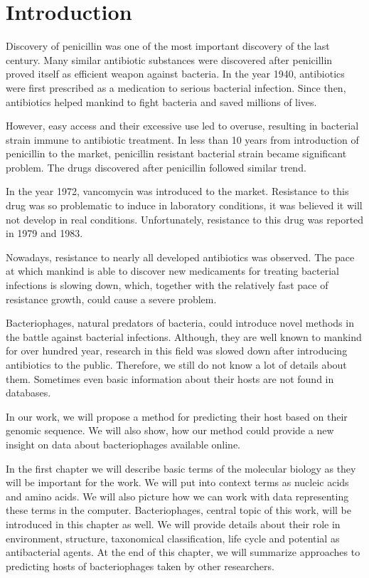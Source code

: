 \chapter*{Introduction} %

Discovery of penicillin was one of the most important discovery of the last century.
Many similar antibiotic substances were discovered after penicillin proved itself as efficient weapon against bacteria.
In the year 1940, antibiotics were first prescribed as a medication to serious bacterial infection. 
Since then, antibiotics helped mankind to fight bacteria and saved millions of lives.

However, easy access and their excessive use led to overuse, resulting in bacterial strain immune to antibiotic treatment. 
In less than 10 years from introduction of penicillin to the market, penicillin resistant bacterial strain became significant problem.
The drugs discovered after penicillin followed similar trend.

In the year 1972, vancomycin was introduced to the market.
Resistance to this drug was so problematic to induce in laboratory conditions, it was believed it will not develop in real conditions.
Unfortunately, resistance to this drug was reported in 1979 and 1983.

Nowadays, resistance to nearly all developed antibiotics was observed.
The pace at which mankind is able to discover new medicaments for treating bacterial infections is slowing down, which, together with the relatively fast pace of resistance growth, could cause a severe problem. 

Bacteriophages, natural predators of bacteria, could introduce novel methods in the battle against bacterial infections.
Although, they are well known to mankind for over hundred year, research in this field was slowed down after introducing antibiotics to the public.
Therefore, we still do not know a lot of details about them.
Sometimes even basic information about their hosts are not found in databases.

In our work, we will propose a method for predicting their host based on their genomic sequence.
We will also show, how our method could provide a new insight on data about bacteriophages available online.

In the first chapter we will describe basic terms of the molecular biology as they will be important for the work.
We will put into context terms as nucleic acids and amino acids.
We will also picture how we can work with data representing these terms in the computer.
Bacteriophages, central topic of this work, will be introduced in this chapter as well.
We will provide details about their role in environment, structure, taxonomical classification, life cycle and potential as antibacterial agents.
At the end of this chapter, we will summarize approaches to predicting hosts of bacteriophages taken by other researchers.  

